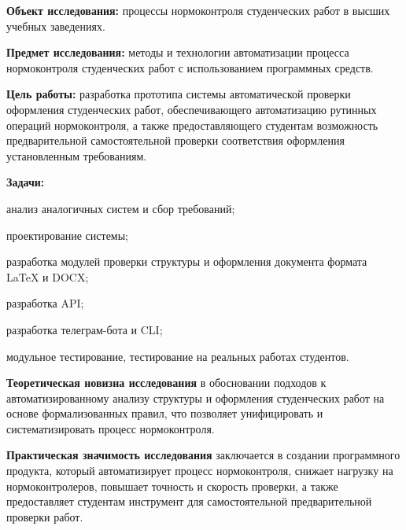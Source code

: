 \documentclass{report}
\begin{document}

{\bf Объект исследования:} процессы нормоконтроля студенческих работ в высших учебных заведениях.

{\bf Предмет исследования:} методы и технологии автоматизации процесса нормоконтроля студенческих работ с использованием программных средств.

{\bf Цель работы:} разработка прототипа системы автоматической проверки оформления студенческих работ, обеспечивающего автоматизацию рутинных операций нормоконтроля, а также предоставляющего студентам возможность предварительной самостоятельной проверки соответствия оформления установленным требованиям.




\break
\break

{\bf Задачи:}
\begin{enumarabic}
\item анализ аналогичных систем и сбор требований;
\item проектирование системы;
\item разработка модулей проверки структуры и оформления документа формата LaTeX и DOCX;
\item разработка API;
\item разработка телеграм-бота и CLI;
\item модульное тестирование, тестирование на реальных работах студентов.
\end{enumarabic}

{\bf Теоретическая новизна исследования} в обосновании подходов к автоматизированному анализу структуры и оформления студенческих работ на основе формализованных правил, что позволяет унифицировать и систематизировать процесс нормоконтроля.

{\bf Практическая значимость исследования} заключается в создании программного продукта, который автоматизирует процесс нормоконтроля, снижает нагрузку на нормоконтролеров, повышает точность и скорость проверки, а также предоставляет студентам инструмент для самостоятельной предварительной проверки работ. 
\end{document}
